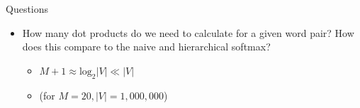 
\begin{vbframe}{Questions}

\vfill

\begin{itemize}
	\item \ques How many dot products do we need to calculate for a given word pair? How does this compare to the naive and hierarchical softmax?
		\begin{itemize}
			\item $M+1 \approx \mathrm{log}_2 |V| \ll |V|$
			\item (for $M=20, |V| = 1,000,000$)
		\end{itemize}
\end{itemize}

\vfill

\end{vbframe}


